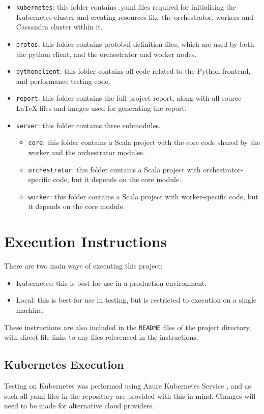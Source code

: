 \begin{itemize}
	\item \texttt{kubernetes}: this folder contains .yaml files required for initialising the Kubernetes cluster and creating resources like the orchestrator, workers and Cassandra cluster within it.
	\item \texttt{protos}: this folder contains protobuf definition files, which are used by both the python client, and the orchestrator and worker nodes.
	\item \texttt{python\textunderscore client}: this folder contains all code related to the Python frontend, and performance testing code.
	\item \texttt{report}: this folder contains the full project report, along with all source LaTeX files and images used for generating the report.
	\item \texttt{server}: this folder contains three submodules.
	\begin{itemize}
		\item \texttt{core}: this folder contains a Scala project with the core code shared by the worker and the orchestrator modules.
		\item \texttt{orchestrator}: this folder contains a Scala project with orchestrator-specific code, but it depends on the core module.
		\item \texttt{worker}: this folder contains a Scala project with worker-specific code, but it depends on the core module.
	\end{itemize}
\end{itemize}

\section{Execution Instructions}
There are two main ways of executing this project:
\begin{itemize}
	\item Kubernetes: this is best for use in a production environment.
	\item Local: this is best for use in testing, but is restricted to execution on a single machine.
\end{itemize}

These instructions are also included in the \texttt{README} files of the project directory, with direct file links to any files referenced in the instructions.

\subsection{Kubernetes Execution}
Testing on Kubernetes was performed using Azure Kubernetes Service \cite{azurekubernetesservice}, and as such all yaml files in the repository are provided with this in mind. Changes will need to be made for alternative cloud providers.

